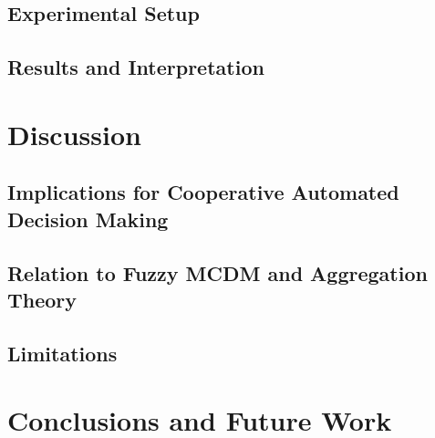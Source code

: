 \documentclass[mathematics,article,submit,moreauthors]{Definitions/mdpi}
\begin{document}

\subsection{Experimental Setup}


\subsection{Results and Interpretation}



\section{Discussion}


\subsection{Implications for Cooperative Automated Decision Making}


\subsection{Relation to Fuzzy MCDM and Aggregation Theory}

%
%

\subsection{Limitations}



\section{Conclusions and Future Work}

%
%
\end{document}
